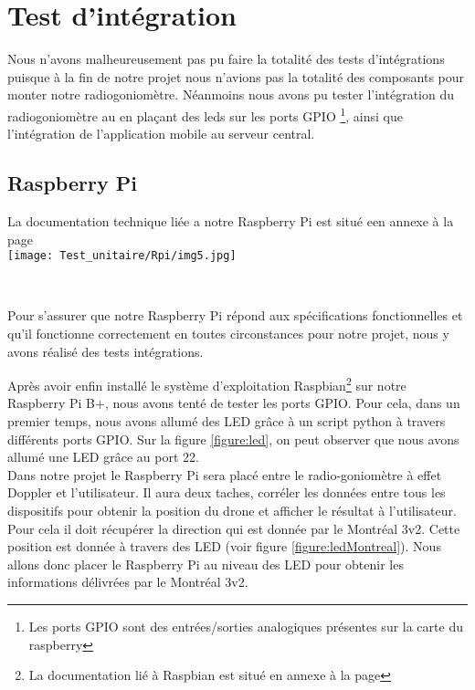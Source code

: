 
\chapter{Test d'intégration}

Nous n'avons malheureusement pas pu faire la totalité des tests d'intégrations puisque à la fin de notre projet nous n'avions pas la totalité des composants pour monter notre radiogoniomètre. Néanmoins nous avons pu tester l'intégration du radiogoniomètre au \rpi en plaçant des leds sur les ports GPIO \footnote{Les ports GPIO sont des entrées/sorties analogiques présentes sur la carte du raspberry}, ainsi que l'intégration de l'application mobile au serveur central.


\section{Raspberry Pi}
La documentation technique liée a notre Raspberry Pi est situé een annexe à la page \pageref{annexe:rpi}
~\\

\texttt{[image: Test\_unitaire/Rpi/img5.jpg]}

~\\
\parindent=15pt

Pour s'assurer que notre Raspberry Pi répond aux spécifications fonctionnelles et qu'il fonctionne correctement en toutes circonstances pour notre projet, nous y avons réalisé des tests intégrations.

Après avoir enfin installé le système d'exploitation Raspbian\footnote{La documentation lié à Raspbian est situé en annexe à la page \pageref{annexe:raspbian}} sur notre Raspberry Pi B+, nous avons tenté de tester les ports GPIO. Pour cela, dans un premier temps, nous avons allumé des LED grâce à un script python à travers différents ports GPIO. Sur la figure \ref{figure:led}, on peut observer que nous avons allumé une LED grâce au port 22.
~\\

Dans notre projet le Raspberry Pi sera placé entre le radio-goniomètre à effet Doppler et l'utilisateur. Il aura deux taches, corréler les données entre tous les dispositifs pour obtenir la position du drone et afficher le résultat à l'utilisateur. Pour cela il doit récupérer la direction qui est donnée par le Montréal 3v2. Cette position est donnée à travers des LED (voir figure \ref{figure:ledMontreal}). Nous allons donc placer le Raspberry Pi au niveau des LED pour obtenir les informations délivrées par le Montréal 3v2. %

